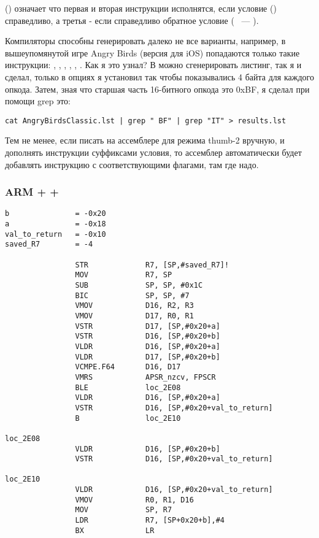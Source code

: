  () означает что первая и вторая инструкции исполнятся, если 
условие  () справедливо,
а третья - если справедливо обратное условие ( ~--- ).

Компиляторы способны генерировать далеко не все варианты, например, в вышеупомянутой игре Angry Birds
(версия  для iOS) попадаются только такие инструкции: , , , , 
, .
\index{\GrepUsage}
Как я это узнал? В \IDA можно сгенерировать листинг, так я и сделал, только в опциях я установил так 
чтобы показывались 4 байта для каждого опкода. Затем, зная что старшая часть 16-битного опкода  
это 0xBF, я сделал при помощи grep это:

\begin{lstlisting}
cat AngryBirdsClassic.lst | grep " BF" | grep "IT" > results.lst
\end{lstlisting}

Тем не менее, если писать на ассемблере для режима thumb-2 вручную, и дополнять инструкции суффиксами
условия, то ассемблер автоматически будет добавлять инструкцию  с соответствующими флагами, там
где надо.

\subsubsection{ARM + \NonOptimizingXcode + \ARMMode}

\begin{lstlisting}
b               = -0x20
a               = -0x18
val_to_return   = -0x10
saved_R7        = -4

                STR             R7, [SP,#saved_R7]!
                MOV             R7, SP
                SUB             SP, SP, #0x1C
                BIC             SP, SP, #7
                VMOV            D16, R2, R3
                VMOV            D17, R0, R1
                VSTR            D17, [SP,#0x20+a]
                VSTR            D16, [SP,#0x20+b]
                VLDR            D16, [SP,#0x20+a]
                VLDR            D17, [SP,#0x20+b]
                VCMPE.F64       D16, D17
                VMRS            APSR_nzcv, FPSCR
                BLE             loc_2E08
                VLDR            D16, [SP,#0x20+a]
                VSTR            D16, [SP,#0x20+val_to_return]
                B               loc_2E10

loc_2E08
                VLDR            D16, [SP,#0x20+b]
                VSTR            D16, [SP,#0x20+val_to_return]

loc_2E10
                VLDR            D16, [SP,#0x20+val_to_return]
                VMOV            R0, R1, D16
                MOV             SP, R7
                LDR             R7, [SP+0x20+b],#4
                BX              LR
\end{lstlisting}

